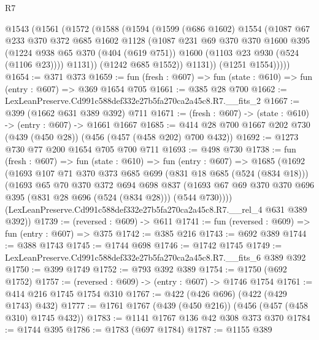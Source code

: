 \begin{lexlean}{R7}
\begin{coremodule}
      @1543
        (@1561
          (@1572
            (@1588
              (@1594
                (@1599
                  (@686 @1602)
                  @1554
                  (@1087
                    @67
                    @233
                    @370
                    @372
                    @685
                    @1602
                    @1128
                    (@1087
                      @231
                      @69
                      @370
                      @370
                      @1600
                      @395
                      (@1224
                        @938
                        @65
                        @370
                        (@404 (@619 @751))
                        @1600
                        (@1103 @23 @930 (@524 (@1106 @23))))
                      @1131))
                  (@1242 @685 @1552))
                @1131))
            (@1251 @1554)))))
@1654 := @371 @373
@1659 := fun (fresh : @607) => fun (state : @610) => fun (entry : @607) => @369 @1654 @705
@1661 := @385 @28 @700
@1662 := LexLeanPreserve.Cd991c588def332e27b5fa270ca2a45c8.R7.__fits_2
@1667 := @399 (@1662 @631 @389 @392) @711
@1671 := (fresh : @607) -> (state : @610) -> (entry : @607) -> @1661 @1667
@1685 := @414 @28 @700 @1667 @202 @730 (@439 (@450 @28)) (@456 (@457 (@458 @202) @700 @432))
@1692 := @1273 @730 @77 @200 @1654 @705 @700 @711
@1693 := @498 @730
@1738 := fun (fresh : @607) =>
  fun (state : @610) =>
  fun (entry : @607) =>
  @1685
    (@1692
      (@1693
        @107
        @71
        @370
        @373
        @685
        @699
        (@831 @18 @685 (@524 (@834 @18)))
        (@1693
          @65
          @70
          @370
          @372
          @694
          @698
          @837
          (@1693 @67 @69 @370 @370 @696 @395 (@831 @28 @696 (@524 (@834 @28))) (@544 @730))))
      (LexLeanPreserve.Cd991c588def332e27b5fa270ca2a45c8.R7.__rel_4 @631 @389 @392))
@1739 := (reversed : @609) -> @611
@1741 := fun (reversed : @609) => fun (entry : @607) => @375
@1742 := @385 @216
@1743 := @692 @389
@1744 := @388 @1743
@1745 := @1744 @698
@1746 := @1742 @1745
@1749 := LexLeanPreserve.Cd991c588def332e27b5fa270ca2a45c8.R7.__fits_6 @389 @392
@1750 := @399 @1749
@1752 := @793 @392 @389
@1754 := @1750 (@692 @1752)
@1757 := (reversed : @609) -> (entry : @607) -> @1746 @1754
@1761 := @414 @216 @1745 @1754 @310
@1767 := @422 (@426 @696) (@422 (@429 @1743) @432)
@1777 := @1761 @1767 (@439 (@450 @216)) (@456 (@457 (@458 @310) @1745 @432))
@1783 := @1141 @1767 @136 @42 @308 @373 @370
@1784 := @1744 @395
@1786 := @1783 (@697 @1784)
@1787 := @1155 @389

\end{coremodule}
\end{lexlean}
